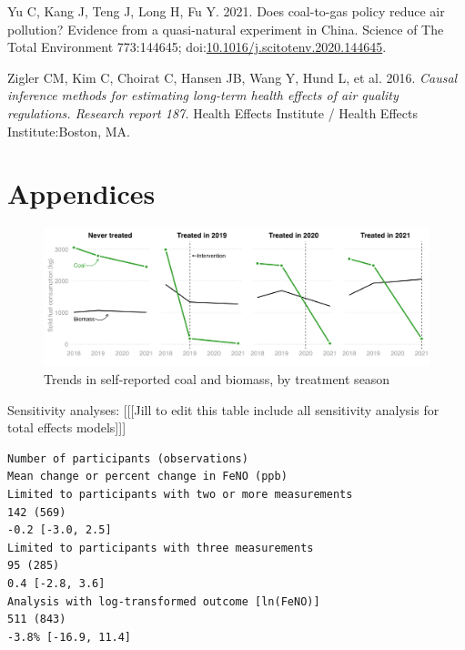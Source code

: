 \documentclass[
  letterpaper,
  DIV=11,
  numbers=noendperiod]{scrartcl}
\newlength{\cslhangindent}
\newlength{\cslentryspacingunit} %
\newenvironment{CSLReferences}[2] %
 {%
  \setlength{\parindent}{0pt}
  \ifodd #1
  \let\oldpar\par
  \def\par{\hangindent=\cslhangindent\oldpar}
  \fi
  \setlength{\parskip}{#2\cslentryspacingunit}
 }%
 {}
\begin{document}
\begin{CSLReferences}{1}{0}
\leavevmode{}%
Yu C, Kang J, Teng J, Long H, Fu Y. 2021. Does coal-to-gas policy reduce
air pollution? {Evidence} from a quasi-natural experiment in {China}.
Science of The Total Environment 773:144645;
doi:\href{https://doi.org/10.1016/j.scitotenv.2020.144645}{10.1016/j.scitotenv.2020.144645}.

\leavevmode{}%
Zigler CM, Kim C, Choirat C, Hansen JB, Wang Y, Hund L, et al. 2016.
\emph{Causal inference methods for estimating long-term health effects
of air quality regulations. {Research} report 187.} Health Effects
Institute / Health Effects Institute:Boston, MA.

\end{CSLReferences}

\newpage
\appendix
\renewcommand{\thefigure}{A\arabic{figure}}
\renewcommand{\thetable}{A\arabic{table}}
\setcounter{figure}{0}
\setcounter{table}{0}

\hypertarget{appendices}{%
\section{Appendices}\label{appendices}}

\begin{figure}[H]

{\centering \includegraphics[width=1\textwidth,height=\textheight]{images/coal-plot.png}

}

\caption{\label{fig-afig-coal}Trends in self-reported coal and biomass,
by treatment season}

\end{figure}

Sensitivity analyses: {[}{[}{[}Jill to edit this table include all
sensitivity analysis for total effects models{]}{]}{]}

\begin{verbatim}
Number of participants (observations)
Mean change or percent change in FeNO (ppb)
Limited to participants with two or more measurements
142 (569)
-0.2 [-3.0, 2.5]
Limited to participants with three measurements
95 (285)
0.4 [-2.8, 3.6]
Analysis with log-transformed outcome [ln(FeNO)]
511 (843)
-3.8% [-16.9, 11.4]
\end{verbatim}
\end{document}
